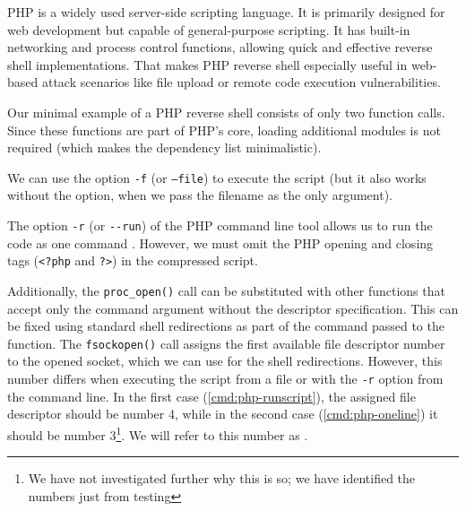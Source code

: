 PHP is a widely used server-side scripting language. It is primarily designed for web development but capable of general-purpose scripting. It has built-in networking and process control functions, allowing quick and effective reverse shell implementations. That makes PHP reverse shell especially useful in web-based attack scenarios like file upload or remote code execution vulnerabilities.

Our minimal example of a PHP reverse shell consists of only two function calls. Since these functions are part of PHP's core, loading additional modules is not required (which makes the dependency list minimalistic).


We can use the option \texttt{-f} (or \texttt{--file}) to execute the script (but it also works without the option, when we pass the filename as the only argument).


The option \texttt{-r} (or \texttt{-{}-run}) of the PHP command line tool allows us to run the code as one command \cite{php-man}. However, we must omit the PHP opening and closing tags (\texttt{<?php} and \texttt{?>}) in the compressed script.


Additionally, the \texttt{proc\_open()} call can be substituted with other functions that accept only the command argument without the descriptor specification. This can be fixed using standard shell redirections as part of the command passed to the function. The \texttt{fsockopen()} call assigns the first available file descriptor number to the opened socket, which we can use for the shell redirections. However, this number differs when executing the script from a file or with the \texttt{-r} option from the command line. In the first case (\cref{cmd:php-runscript}), the assigned file descriptor should be number 4, while in the second case (\cref{cmd:php-oneline}) it should be number 3\footnote{We have not investigated further why this is so; we have identified the numbers just from testing}. We will refer to this number as \fd.

